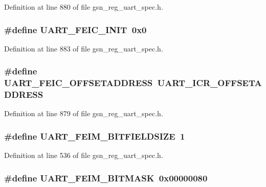 Definition at line 880 of file gsn\_\-reg\_\-uart\_\-spec.h.

\hypertarget{a00575_aa2908bf121ac85adc4db6e4ce5501dc0}{
\subsubsection[{UART\_\-FEIC\_\-INIT}]{\setlength{\rightskip}{0pt plus 5cm}\#define UART\_\-FEIC\_\-INIT~0x0}}
\label{a00575_aa2908bf121ac85adc4db6e4ce5501dc0}


Definition at line 883 of file gsn\_\-reg\_\-uart\_\-spec.h.

\hypertarget{a00575_a7539d0ad277164cc77056b203c39955c}{
\subsubsection[{UART\_\-FEIC\_\-OFFSETADDRESS}]{\setlength{\rightskip}{0pt plus 5cm}\#define UART\_\-FEIC\_\-OFFSETADDRESS~UART\_\-ICR\_\-OFFSETADDRESS}}
\label{a00575_a7539d0ad277164cc77056b203c39955c}


Definition at line 879 of file gsn\_\-reg\_\-uart\_\-spec.h.

\hypertarget{a00575_a45bee7008e5efe35dcc8637782a131e9}{
\subsubsection[{UART\_\-FEIM\_\-BITFIELDSIZE}]{\setlength{\rightskip}{0pt plus 5cm}\#define UART\_\-FEIM\_\-BITFIELDSIZE~1}}
\label{a00575_a45bee7008e5efe35dcc8637782a131e9}


Definition at line 536 of file gsn\_\-reg\_\-uart\_\-spec.h.

\hypertarget{a00575_a8b9e57ccd9226dea5ef17a9ebd69df6b}{
\subsubsection[{UART\_\-FEIM\_\-BITMASK}]{\setlength{\rightskip}{0pt plus 5cm}\#define UART\_\-FEIM\_\-BITMASK~0x00000080}}
\label{a00575_a8b9e57ccd9226dea5ef17a9ebd69df6b}


